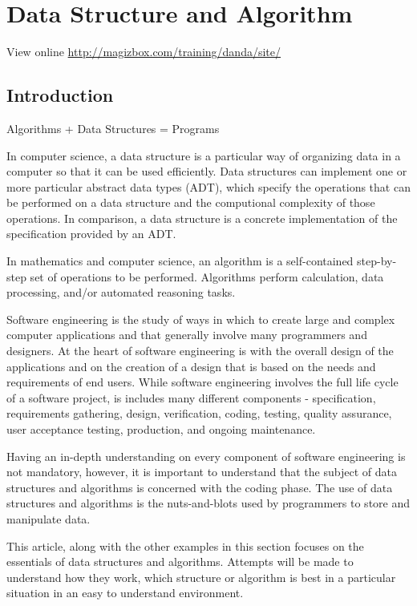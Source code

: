 \chapter{Data Structure and Algorithm}

View online \href{http://magizbox.com/training/danda/site/}{http://magizbox.com/training/danda/site/}

\section{Introduction}

Algorithms + Data Structures = Programs

In computer science, a data structure is a particular way of organizing data in a computer so that it can be used efficiently. Data structures can implement one or more particular abstract data types (ADT), which specify the operations that can be performed on a data structure and the computional complexity of those operations. In comparison, a data structure is a concrete implementation of the specification provided by an ADT.

In mathematics and computer science, an algorithm is a self-contained step-by-step set of operations to be performed. Algorithms perform calculation, data processing, and/or automated reasoning tasks.

Software engineering is the study of ways in which to create large and complex computer applications and that generally involve many programmers and designers. At the heart of software engineering is with the overall design of the applications and on the creation of a design that is based on the needs and requirements of end users. While software engineering involves the full life cycle of a software project, is includes many different components - specification, requirements gathering, design, verification, coding, testing, quality assurance, user acceptance testing, production, and ongoing maintenance.

Having an in-depth understanding on every component of software engineering is not mandatory, however, it is important to understand that the subject of data structures and algorithms is concerned with the coding phase. The use of data structures and algorithms is the nuts-and-blots used by programmers to store and manipulate data.

This article, along with the other examples in this section focuses on the essentials of data structures and algorithms. Attempts will be made to understand how they work, which structure or algorithm is best in a particular situation in an easy to understand environment.

